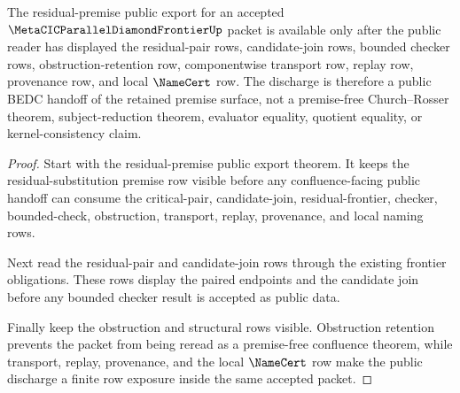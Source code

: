 \begin{theorem}
\label{thm:metacic-parallel-diamond-frontier-residual-premise-public-discharge}
The residual-premise public export for an accepted $\MetaCICParallelDiamondFrontierUp$ packet is available only after the public reader has displayed the residual-pair rows, candidate-join rows, bounded checker rows, obstruction-retention row, componentwise transport row, replay row, provenance row, and local $\NameCert$ row. The discharge is therefore a public BEDC handoff of the retained premise surface, not a premise-free Church--Rosser theorem, subject-reduction theorem, evaluator equality, quotient equality, or kernel-consistency claim.
\end{theorem}
\begin{proof}
Start with the residual-premise public export theorem. It keeps the residual-substitution premise row visible before any confluence-facing public handoff can consume the critical-pair, candidate-join, residual-frontier, checker, bounded-check, obstruction, transport, replay, provenance, and local naming rows.

Next read the residual-pair and candidate-join rows through the existing frontier obligations. These rows display the paired endpoints and the candidate join before any bounded checker result is accepted as public data.

Finally keep the obstruction and structural rows visible. Obstruction retention prevents the packet from being reread as a premise-free confluence theorem, while transport, replay, provenance, and the local $\NameCert$ row make the public discharge a finite row exposure inside the same accepted packet.
\end{proof}
